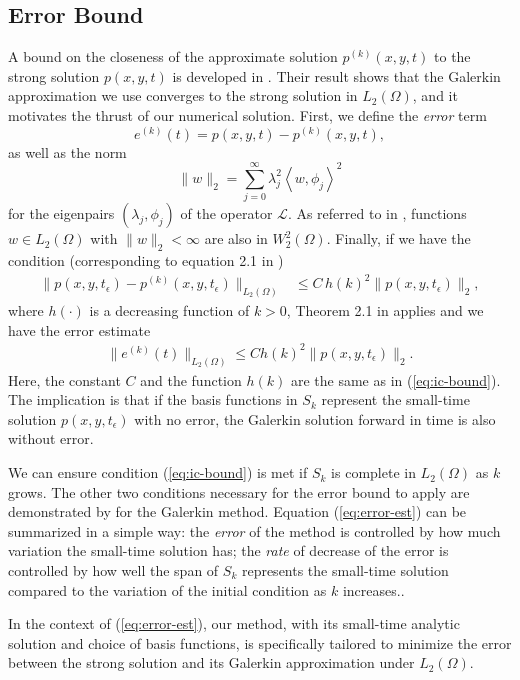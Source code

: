 \documentclass[10pt]{article}
\begin{document}
\subsection{Error Bound} \label{sec:error-bound}
A bound on the closeness of the approximate solution $p^{(k)}(x,y,t)$
to the strong solution $p(x,y,t)$ is developed in
\cite{bramble1977some}.  Their result shows that the Galerkin
approximation we use converges to the strong solution in
$L_2(\Omega)$, and it motivates the thrust of our numerical
solution. First, we define the \textit{error} term
\[
  e^{(k)}(t) = p(x,y,t) - p^{(k)}(x,y,t),
\]
as well as the norm
\[
  \| w \|_2 = \sum_{j=0}^\infty \lambda_j^2 \left<w, \phi_j\right>^2
\]
for the eigenpairs $(\lambda_j, \phi_j)$ of the operator
$\mathcal{L}$. As referred to in \cite{bramble1977some}, functions
$w \in L_2(\Omega)$ with $\|w\|_2 < \infty$ are also in
$W_2^2(\Omega)$. Finally, if we have the condition (corresponding to
equation 2.1 in \cite{bramble1977some})
\begin{align}
  \| p(x,y,t_\epsilon) - p^{(k)}(x,y,t_\epsilon) \|_{L_2(\Omega)} &\leq C\, h(k)^2 \| p(x,y,t_\epsilon) \|_2, \label{eq:ic-bound}
\end{align}
where $h(\cdot)$ is a decreasing function of $k > 0$, Theorem 2.1 in
\cite{bramble1977some} applies and we have the error estimate
\begin{align}
  \| e^{(k)}(t) \|_{L_2(\Omega)} \leq C h(k)^2 \| p(x,y,t_\epsilon) \|_{2}. \label{eq:error-est}
\end{align}
Here, the  constant $C$  and the  function $h(k)$ are  the same  as in
(\ref{eq:ic-bound}). The implication is that if the basis functions in
$S_k$ represent  the small-time  solution $p(x,y,t_\epsilon)$  with no
error, the Galerkin solution forward in time is also without error.

We can ensure condition (\ref{eq:ic-bound}) is met if $S_k$ is
complete in $L_2(\Omega)$ as $k$ grows. The other two conditions
necessary for the error bound to apply are demonstrated by
\cite{bramble1977some} for the Galerkin method. Equation
(\ref{eq:error-est}) can be summarized in a simple way: the
\textit{error} of the method is controlled by how much variation the
small-time solution has; the \textit{rate} of decrease of the error is
controlled by how well the span of $S_k$ represents the small-time
solution compared to the variation of the initial condition as $k$
increases..

In the context of (\ref{eq:error-est}), our method, with its small-time
analytic solution and choice of basis functions, is specifically
tailored to minimize the error between the strong solution and its
Galerkin approximation under $L_2(\Omega)$.
\end{document}
